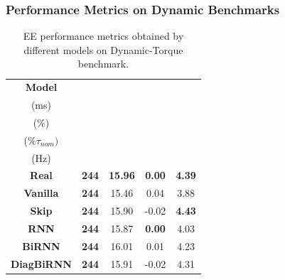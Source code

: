 \documentclass{beamer}
\begin{document}
\begin{frame}
\frametitle{Performance Metrics on Dynamic Benchmarks}

\begin{table}[ht!]
    \centering
    \begin{tabular}{c c c c c}
        \toprule
          \textbf{Model}   & \shortstack{\boldmath{$t_{95\%}$} \\ (ms)} & \shortstack{\boldmath{$D\%$} \\ (\%)} & \shortstack{\boldmath{$E_{ss}$} \\ ($\%\tau_{nom})$}  & \shortstack{\boldmath{$SD$} \\ (Hz)} \\
         \midrule
\textbf{Real} & \textbf{244}  & \textbf{15.96} & \textbf{0.00} & \textbf{4.39} \\
\midrule
\textbf{Vanilla}  & \leavevmode\color{good}\textbf{244}  & \leavevmode\color{bad}15.46 & \leavevmode\color{good}0.04 & \leavevmode\color{bad}3.88 \\
\textbf{Skip}  & \leavevmode\color{good}\textbf{244}  & \leavevmode\color{good}15.90 & \leavevmode\color{good}-0.02 & \leavevmode\color{good}\textbf{4.43} \\
\textbf{RNN}  & \leavevmode\color{good}\textbf{244}  & \leavevmode\color{good}15.87 & \leavevmode\color{good}\textbf{0.00} & \leavevmode\color{bad}4.03 \\
\textbf{BiRNN}  & \leavevmode\color{good}\textbf{244}  & \leavevmode\color{good}16.01 & \leavevmode\color{good}0.01 & 4.23 \\
\textbf{DiagBiRNN}  & \leavevmode\color{good}\textbf{244}  & \leavevmode\color{good}15.91 & \leavevmode\color{good}-0.02 & \leavevmode\color{good}4.31 \\
         \bottomrule
    \end{tabular}
    \caption{EE performance metrics obtained by different models on Dynamic-Torque benchmark.}
    \label{tab:dynamictorque}
    \vspace{-1em}
\end{table}


\end{frame}
\end{document}

